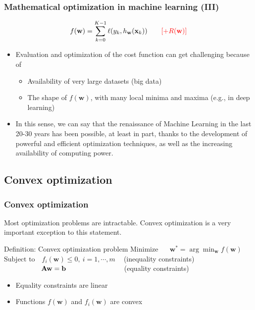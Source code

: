 \documentclass{beamer}
\newcommand{\xM}{{\mathbf x}}
\newcommand{\w}{{\mathbf w}}
\begin{document}
\begin{frame}

	\frametitle{Mathematical optimization in machine learning (III)}
$$f(\w) = \sum_{k=0}^{K-1} \ell(y_k, h_\w(\xM_k)) ~~~~~~ \color{red}{[+R(\w)]}$$
\begin{itemize}

\item Evaluation and optimization of the cost function can get challenging because of
	\begin{itemize}
	\item Availability of very large datasets (big data)
	\item The shape of $f(\w)$, with many local minima and maxima (e.g., in deep learning)
	\end{itemize}

\item In this sense, we can say that the renaissance of Machine Learning in the last 20-30 years has been possible, at least in part, thanks to the development of powerful and efficient optimization techniques, as well as the increasing availability of computing power.

\end{itemize}

\end{frame}

\subsection{Convex optimization}

\begin{frame}

	\frametitle{Convex optimization}

Most optimization problems are intractable. Convex optimization is a very important exception to this statement. 
	
	\begin{block}{Definition: Convex optimization problem}
	$\text{Minimize~~~~~}{\w}^\ast= \arg\min_\w f(\w)$\\
	$\text{Subject to~~~} f_i(\w) \leq 0, ~i=1,\cdots,m~~~~$ (inequality constraints)\\
	$\text{~~~~~~~~~~~~~~~~} {\bf A}{\w} = {\bf b}~~~~~~~~~~~~~~~~~~~~~~~~$ (equality constraints)
	
	\end{block}

	\begin{itemize}
		\item Equality constraints are linear
		\item Functions $f(\w)$ and $f_i(\w)$ are convex
	\end{itemize}

\end{frame}
\end{document}
